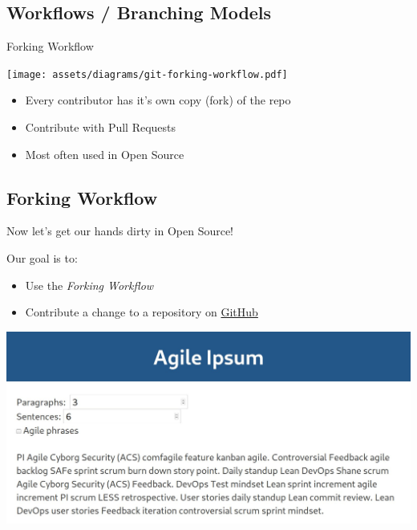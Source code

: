 \subsection{Workflows / Branching Models}
\begin{frame}[fragile]
  \subslidetitle
  Forking Workflow
    \centerline{\texttt{[image: assets/diagrams/git-forking-workflow.pdf]}}

  \vspace{2em}
  \begin{itemize}
    \item Every contributor has it's own copy (fork) of the repo
    \item Contribute with Pull Requests
    \item Most often used in Open Source
  \end{itemize}

\end{frame}

\subsection{Forking Workflow}
\begin{frame}[fragile]
  \subslidetitle

  Now let's get our hands dirty in Open Source! \\
  \vspace{1em}

  Our goal is to:
  \begin{itemize}
    \item Use the \textit{Forking Workflow}
    \item Contribute a change to a repository on \href{https://github.com}{GitHub}
  \end{itemize}

  \centerline{\includegraphics[width=\textwidth]{../assets/images/agile-ipsum.jpeg}}

\end{frame}



